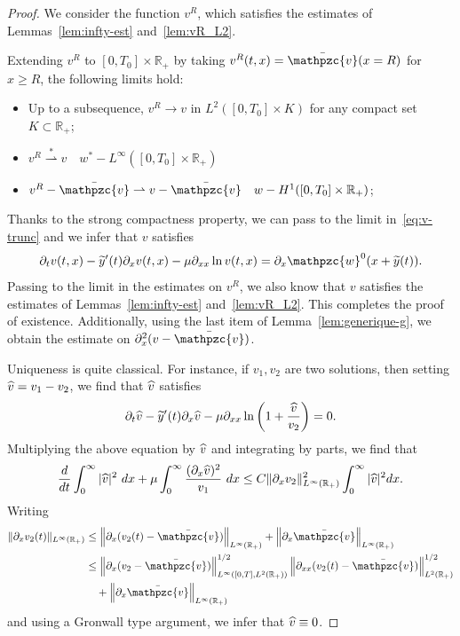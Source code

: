 \documentclass[AHL,Unicode,longabstracts,published]{cedram}
\newcommand{\R}{\mathbb{R}}
\newcommand{\p}{\partial}
\newcommand{\bv}{\bar{\mathpzc{v}}}
\newcommand{\tw}{\mathpzc{w}}
\newcommand{\ty}{\widetilde{y}}
\let\oldhat\hat
\renewcommand*{\hat}[1]{\mathchoice{\widehat{#1}}{\widehat{#1}}{\oldhat{#1}}{\oldhat{#1}}}
\begin{document}
\begin{proof}
We consider the function $v^R$, which satisfies the estimates of Lemmas~\ref{lem:infty-est} and~\ref{lem:vR_L2}.

Extending $v^R$ to $[0,T_0] \times \R_+$ by taking $v^R(t,x)=\bv(x=R)$ for $x\geq R$, the following limits hold:
\begin{itemize}
\item Up to a subsequence, $v^R\to v$ in $L^2([0,T_0]\times K)$ for any compact set $K\subset \R_+$;
\item $v^R\stackrel{*}{\rightharpoonup} v\quad w^*-L^\infty([0,T_0]\times \R_+)$
\item $v^R-\bv \rightharpoonup v-\bv \quad w-H^1([0,T_0]\times \R_+)$;
\end{itemize}
Thanks to the strong compactness property, we can pass to the limit in~\eqref{eq:v-trunc} and we infer that $v$ satisfies
\begin{equation*}
\partial_t v(t,x) -\ty'(t) \partial_x v(t,x) - \mu \partial_{xx} \ln v(t,x) = \partial_x \tw^0(x+\ty(t)).
\end{equation*}
Passing to the limit in the estimates on $v^R$, we also know that $v$ satisfies the estimates of Lemmas~\ref{lem:infty-est} and~\ref{lem:vR_L2}. This completes the proof of existence. Additionally, using the last item of Lemma~\ref{lem:generique-g}, we obtain the estimate on $\p_x^2(v-\bv)$.

Uniqueness is quite classical. For instance, if $v_1,v_2$ are two solutions, then setting $\hat{v} =v_1-v_2$, we find that $\hat{v}$ satisfies
\[
\p_t \hat{v} - \ty'(t)\p_x \hat{v} - \mu \p_{xx} \ln \left(1+ \frac{\hat{v}}{v_2}\right)=0.
\]
Multiplying the above equation by $\hat{v}$ and integrating by parts, we find that
\[
\frac{d}{dt}\int_0^\infty |\hat{v} |^2 \ dx + \mu \int_0^\infty \frac{(\p_x \hat{v})^2}{v_1} \ dx
\leq C \|\p_x v_2 \|_{L^\infty(\R_+)}^2 \int_0^\infty |\hat{v}|^2 dx.
\]
Writing
\begin{align*}
\|\p_x v_2(t)\|_{L^\infty(\R_+)}&\leq \left\|\p_x (v_2(t)-\bv)\right\|_{L^\infty(\R_+)} + \left\|\p_x \bv\right\|_{L^\infty(\R_+)}\\
&\leq \left\|\p_x (v_2-\bv)\right\|^{1/2}_{L^\infty([0,T], L^2(\R_+))}\left\|\p_{xx} (v_2(t)-\bv)\right\|^{1/2}_{ L^2(\R_+)}\\&\quad
 + \left\|\p_x \bv\right\|_{L^\infty(\R_+)}
\end{align*}
and using a Gronwall type argument, we infer that $\hat{v} \equiv 0$.
\end{proof}
\end{document}
